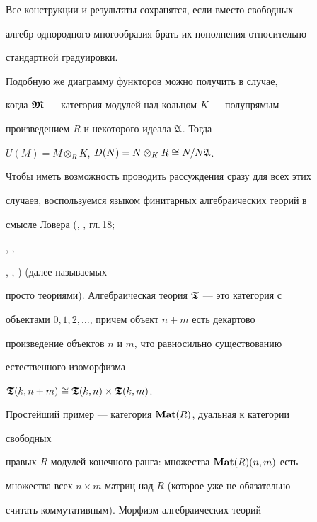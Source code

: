 \begin{exam}


Все конструкции и результаты сохранятся, если вместо свободных


алгебр однородного многообразия брать их пополнения относительно


стандартной градуировки.


\end{exam}





\begin{exam}


Подобную же диаграмму функторов можно получить в случае,


когда $\boldsymbol{\frak M}$ --- категория модулей над кольцом $K$ --- полупрямым


произведением $R$ и некоторого идеала ${\frak A}$. Тогда


$U(M)=M\otimes_R K$, $D(N)=N\otimes_K R \cong N/N{\frak A}$.


\end{exam}





Чтобы иметь возможность проводить рассуждения сразу для всех этих


случаев, воспользуемся языком финитарных алгебраических теорий в


смысле Ловера (\cite{Law}, \cite{Shub}, гл.\,18;


\cite{KR}, \cite{BF},


\cite{M}, \cite{W1}, \cite{W2}) (далее называемых


просто теориями). Алгебраическая теория $\boldsymbol{\frak T}$ --- это категория с


объектами $0,1,2,\dotsc$, причем объект $n+m$ есть декартово


произведение объектов $n$ и $m$, что равносильно существованию


естественного изоморфизма


${\boldsymbol{\frak T}}(k,n+m) \cong {\boldsymbol{\frak T}}(k,n) \times {\boldsymbol{\frak T}}(k,m)$.


Простейший пример --- категория ${\bold{Mat}}(R)$, дуальная к категории


свободных


правых $R$-модулей конечного ранга: множества ${\bold{Mat}}(R)(n,m)$ есть


множества всех $n\times m$-матриц над $R$ (которое уже не обязательно


считать коммутативным). Морфизм алгебраических теорий


